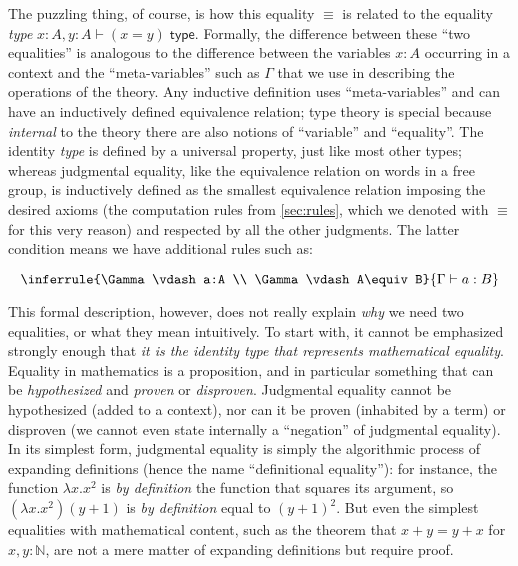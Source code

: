 \documentclass[10pt]{article}
\let\jdeq\equiv
\def\ty{\;\mathsf{type}}
\def\N{\mathbb{N}}
\def\types{\vdash}
\def\equiv{\mathsf{Equiv}}
\numberwithin{equation}{section}
\begin{document}
\begin{subappendices}
The puzzling thing, of course, is how this equality $\jdeq$ is related to the equality \emph{type} $x:A,y:A \types (x=y)\ty$.
Formally, the difference between these ``two equalities'' is analogous to the difference between the variables $x:A$ occurring in a context and the ``meta-variables'' such as $\Gamma$ that we use in describing the operations of the theory.
Any inductive definition uses ``meta-variables'' and can have an inductively defined equivalence relation; type theory is special because \emph{internal} to the theory there are also notions of ``variable'' and ``equality''.
The identity \emph{type} is defined by a universal property, just like most other types; whereas judgmental equality, like the equivalence relation on words in a free group, is inductively defined as the smallest equivalence relation imposing the desired axioms (the computation rules from \cref{sec:rules}, which we denoted with $\jdeq$ for this very reason) and respected by all the other judgments.
The latter condition means we have additional rules such as:
\begin{equation}
  \label{eq:coe}
  \inferrule{\Gamma \types a:A \\ \Gamma\types A\jdeq B}{\Gamma\types a:B}
\end{equation}

This formal description, however, does not really explain \emph{why} we need two equalities, or what they mean intuitively.
To start with, it cannot be emphasized strongly enough that \emph{it is the identity type that represents mathematical equality}.
Equality in mathematics is a proposition, and in particular something that can be \emph{hypothesized} and \emph{proven} or \emph{disproven}.
Judgmental equality cannot be hypothesized (added to a context), nor can it be proven (inhabited by a term) or disproven (we cannot even state internally a ``negation'' of judgmental equality).
In its simplest form, judgmental equality is simply the algorithmic process of expanding definitions (hence the name ``definitional equality''): for instance, the function $\lambda x.x^2$ is \emph{by definition} the function that squares its argument, so $(\lambda x.x^2)(y+1)$ is \emph{by definition} equal to $(y+1)^2$.
But even the simplest equalities with mathematical content, such as the theorem that $x+y=y+x$ for $x,y:\N$, are not a mere matter of expanding definitions but require proof.


\end{subappendices}
\end{document}
